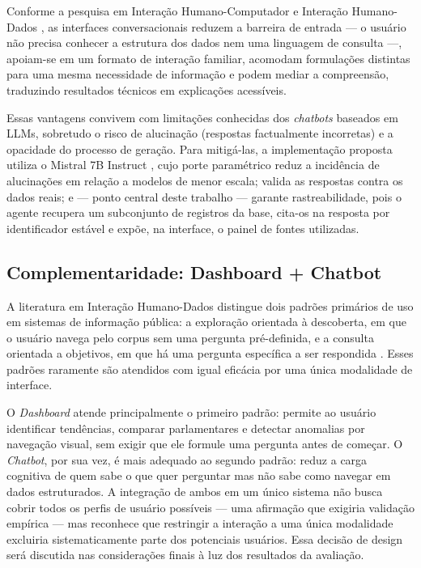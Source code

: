 Conforme a pesquisa em Interação Humano-Computador e Interação Humano-Dados \cite{Hornung2015, Brito2024}, as interfaces conversacionais reduzem a barreira de entrada --- o usuário não precisa conhecer a estrutura dos dados nem uma linguagem de consulta ---, apoiam-se em um formato de interação familiar, acomodam formulações distintas para uma mesma necessidade de informação e podem mediar a compreensão, traduzindo resultados técnicos em explicações acessíveis.

Essas vantagens convivem com limitações conhecidas dos \textit{chatbots} baseados em LLMs, sobretudo o risco de alucinação (respostas factualmente incorretas) e a opacidade do processo de geração. Para mitigá-las, a implementação proposta utiliza o Mistral 7B Instruct \cite{Jiang2023}, cujo porte paramétrico reduz a incidência de alucinações em relação a modelos de menor escala; valida as respostas contra os dados reais; e --- ponto central deste trabalho --- garante rastreabilidade, pois o agente recupera um subconjunto de registros da base, cita-os na resposta por identificador estável e expõe, na interface, o painel de fontes utilizadas.

\subsection{Complementaridade: Dashboard + Chatbot}

A literatura em Interação Humano-Dados distingue dois padrões primários de uso em sistemas de informação pública: a exploração orientada à descoberta, em que o usuário navega pelo corpus sem uma pergunta pré-definida, e a consulta orientada a objetivos, em que há uma pergunta específica a ser respondida \cite{Shneiderman1996}. Esses padrões raramente são atendidos com igual eficácia por uma única modalidade de interface.

O \textit{Dashboard} atende principalmente o primeiro padrão: permite ao usuário identificar tendências, comparar parlamentares e detectar anomalias por navegação visual, sem exigir que ele formule uma pergunta antes de começar. O \textit{Chatbot}, por sua vez, é mais adequado ao segundo padrão: reduz a carga cognitiva de quem sabe o que quer perguntar mas não sabe como navegar em dados estruturados. A integração de ambos em um único sistema não busca cobrir todos os perfis de usuário possíveis — uma afirmação que exigiria validação empírica — mas reconhece que restringir a interação a uma única modalidade excluiria sistematicamente parte dos potenciais usuários. Essa decisão de design será discutida nas considerações finais à luz dos resultados da avaliação.

